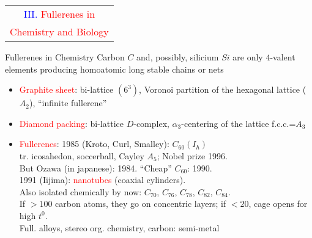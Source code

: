 \documentclass[%
pdf,
colorBG,
slideColor,
]{prosper}
\begin{document}
\begin{slide}{}
\begin{center}
{\Huge 
\begin{tabular*}{8.9cm}{c}
\\[-0.6cm]
\textcolor{blue}{III. }\textcolor{red}{Fullerenes in}\\
\textcolor{red}{Chemistry and Biology}
\end{tabular*}
}
\end{center}
\end{slide}




\begin{slide}{Fullerenes in Chemistry}
Carbon $C$ and, possibly, silicium $Si$ are only $4$-valent elements
producing homoatomic long stable chains or nets
\begin{itemize}
\item \textcolor{red}{Graphite sheet}: bi-lattice $(6^3)$, 
Voronoi partition of the hexagonal lattice ($A_2$), 
``infinite fullerene''
\item \textcolor{red}{Diamond packing}: bi-lattice $D$-complex, 
$\alpha_3$-centering of the lattice f.c.c.=$A_3$
\item \textcolor{red}{Fullerenes}: 1985 (Kroto, Curl, Smalley): 
$C_{60}(I_h)$\\
tr. icosahedon, soccerball, Cayley $A_5$; Nobel prize 1996.\\
But Ozawa (in japanese): 1984. ``Cheap'' $C_{60}$: 1990.\\
1991 (Iijima): \textcolor{red}{nanotubes} (coaxial cylinders).\\
Also isolated chemically by now: $C_{70}$, $C_{76}$, $C_{78}$, 
$C_{82}$, $C_{84}$.\\
If $>100$ carbon atoms, they go on concentric layers; if $<20$, cage opens 
for high $t^{0}$.\\
Full. alloys, stereo org. chemistry, carbon: semi-metal
\end{itemize}

\end{slide}
\end{document}
